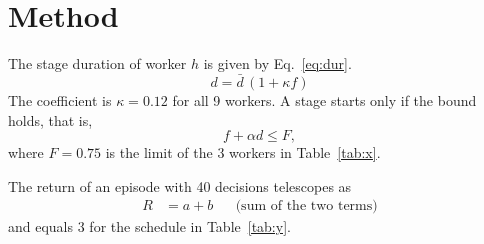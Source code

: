 \section{Method}

The stage duration of worker $h$ is given by Eq.~\eqref{eq:dur}.
\begin{equation}\label{eq:dur}
d = \bar{d}\,(1 + \kappa f)
\end{equation}
The coefficient is $\kappa = 0.12$ for all 9 workers. A stage starts only if the bound holds, that is,
\begin{equation}\label{eq:safe}
f + \alpha d \le F,
\end{equation}
where $F = 0.75$ is the limit of the 3 workers in Table~\ref{tab:x}.

The return of an episode with 40 decisions telescopes as
\begin{align*}
R &= a + b && \text{(sum of the two terms)}
\end{align*}
and equals 3 for the schedule in Table~\ref{tab:y}.
